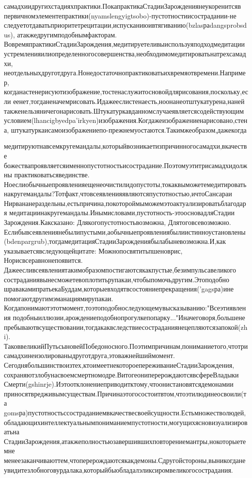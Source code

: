 {самадхиидругихстадияхпрактики.ПокапрактикаСтадииЗарождениянеукоренитсяв
первичномэлементепрактики(nyamslengyigtsobo)-пустотностиисострадании-не
следуетотдаватьприоритетрецитации,испусканиюивтягиванию(bzlasраdangsprobsdus),
атакжедругимподобнымфакторам.
ВовремяпрактикиСтадииЗарождения,медитируетеливыиспользуяподходмедитации
устремленияилиопределенногосовершенства,необходимомедитироватьнатрехсамадхи,
неотдельныхдруготдруга.Нонедостаточнопрактиковатьихвремяотвремени.Например,
когданастенерисуютизображение,тостенаслужитосновойдлярисования,поскольку,если
еенет,тогданеначемрисовать.Идажееслистенаесть,ноонанеотштукатурена,наней
такженельзяничегонарисовать.Штукатуркавданномслучаеявляетсясодействующим
условием(lhancigbyedpa'irkyen)изображения.Когдажеизображениенарисовано,стена,
штукатуркаисамоизображениепо-прежнемуостаются.Такимжеобразом,дажекогда

медитируютнавсемкругемандалы,которыйвозникаетизпричинногосамадхи,вкачестве
божествапроявляетсяименнопустотностьисострадание.Поэтомуэтитрисамадхидолжны
практиковатьсявединстве.
Ноеслиобычныепроявленияещенеочистилидопустоты,токаквыможетемедитировать
накругемандалы?Тотфакт,чтовсеявленияявляютсяпустотностью,ичтоСансараи
Нирвананераздельны,естьпричина,покотороймыможемэтоактуализироватьблагодаря
медитациинакругемандалы.Инымисловами,пустотность-этоосновадляСтадии
Зарождения.Каксказано:
Длякогопустотностьвозможна,
Длятоговсевозможно.
Еслибывсеявлениянебылипустыми,аобычныепроявлениябылиистинноустановлены
(bdenpargrub),тогдамедитацияСтадииЗарождениябылабыневозможна.И,как
указываетсявследующейцитате:
Можнопосвятитьпшеноврис,
Норисвсеравнонепоявится.
Дажеесливсеявлениятакимобразомпостигаютсякакпустые,безимпульсавеликого
состраданиявынесможетевоплотитьрупакаи,чтобыпомочьдругим.Этоподобно
шравакамипратьекаБуддам,которыевходятвсостояниепрекращения('gagsра)ине
помогаютдругимэманациямирупакаи.
Когдапонимаютэтотмомент,тоэтоподобноследующемувысказыванию:"Всеэтиявления
подобныиллюзии,арождениеподобнопрогулкепопарку..."Иначеговоря,большене
пребываютвсуществовании,тогдакаквследствиесостраданиянецепляютсязапокой(zhi).
ТаковвеликийПутьсыновейПобедоносного.Поэтимпричинам,пониманиетого,чтотри
самадхинеизолированыдруготдруга,этоважнейшиймомент.
Сегоднябольшинствоизтех,ктоимеетнекотороепереживаниеСтадииЗарождения,
сохраняютзлобунасвоемсмертномодре.ВитогеониперерождаютсявсфереВладыки
Смерти(gshinrje).Иэтоотклонениеприводитктому,чтоонистановятсядемонамии
приносятвредживымсуществам.Причинаэтогосостоитвтом,чтоэтилюдинеосвоили(та
gomsра)пустотностьссостраданиемвкачествесвоейсущности.Естьмножестволюдей,
обладающихинтеллектуальнымпониманиемпустотности,могущихясновизуализироватьна
СтадииЗарождения,атакжеполностьюзавершившихповторениемантры,нокоторыетемне
менеезаканчиваюттем,чтоперерождаютсякакдемоны.Сдругойстороны,выникогдане
увидитезлобноговурдалака,которыйбыобладалэликсиромвеликогосострадания.

}
